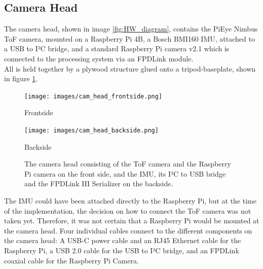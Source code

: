\subsection{Camera Head}
\label{sec:camHead}
The camera head, shown in image \ref{fig:HW_diagram}, contains the PiEye Nimbus ToF camera, mounted on a Raspberry Pi 4B, a Bosch BMI160 IMU, attached to a USB to I²C bridge, and a standard Raspberry Pi camera v2.1 which is connected to the processing system via an FPDLink module.\\
All is held together by a plywood structure glued onto a tripod-baseplate, shown in figure \ref{fig:cameraHead}.
\begin{figure}[H]
    \centering
    \begin{minipage}[b]{0.45\textwidth}
      \texttt{[image: images/cam\_head\_frontside.png]}
      \caption{Frontside}
      \label{fig:cameraHeadfront} 
    \end{minipage} %
    \begin{minipage}[b]{0.45\textwidth}
      \texttt{[image: images/cam\_head\_backside.png]} 
      \caption{Backside}
      \label{fig:cameraHeadback} 
    \end{minipage}
    \caption{The camera head consisting of the ToF camera and the Raspberry Pi camera on the front side, and the IMU, its I²C to USB bridge and the FPDLink III Serializer on the backside.}
    \label{fig:cameraHead}
  \end{figure}
The IMU could have been attached directly to the Raspberry Pi, but at the time of the implementation, the decision on how to connect the ToF camera was not taken yet. Therefore, it was not certain that a Raspberry Pi would be mounted at the camera head.
Four individual cables connect to the different components on the camera head: A USB-C power cable and an RJ45 Ethernet cable for the Raspberry Pi, a USB 2.0 cable for the USB to I²C bridge, and an FPDLink coaxial cable for the Raspberry Pi Camera.


